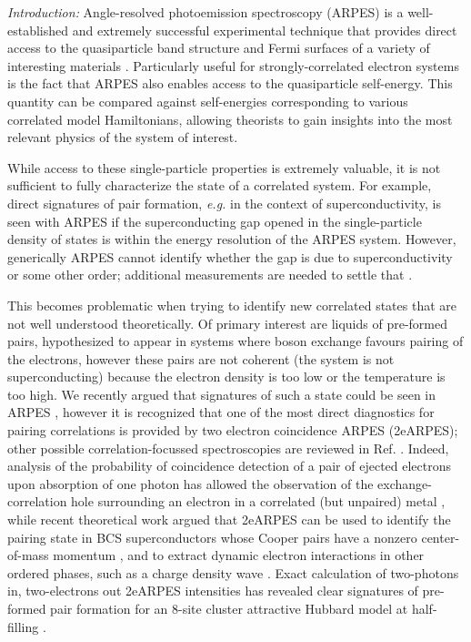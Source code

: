 \documentclass[prl,twocolumn,showpacs,amsmath,amssymb,superscriptaddress,floatfix]{revtex4}
\begin{document}
\setcounter{figure}{0}

{\em Introduction:} Angle-resolved photoemission spectroscopy (ARPES) is a well-established and  extremely successful experimental technique that provides direct access to the quasiparticle band structure and Fermi surfaces of a variety of interesting materials \cite{Damascelli2003}. Particularly useful for strongly-correlated electron systems is the fact that ARPES also enables access to  the quasiparticle self-energy. This quantity can be compared against self-energies corresponding to various correlated model Hamiltonians, allowing theorists to gain insights into the most relevant physics of the system of interest.

While access to these single-particle properties is extremely valuable, it is not sufficient to fully characterize the state of a  correlated system. For example, direct signatures of pair formation, {\em e.g.} in the context of superconductivity, is seen with ARPES  if the superconducting gap opened in the single-particle density of states is within the energy resolution of the ARPES system. However, generically ARPES cannot  identify whether the gap is due to superconductivity or some other order;  additional measurements are needed to settle that \cite{Damascelli2004}.

This becomes problematic  when trying to identify new  correlated states that are not well understood theoretically. Of primary interest are liquids of pre-formed pairs, hypothesized to appear in systems where boson exchange  favours pairing of the electrons, however these pairs are not coherent (the system is not superconducting) because the electron density is too low or the temperature is too high. We recently argued that signatures of such a state could be seen in ARPES \cite{Klemen2025}, however it  is recognized that one of the most direct diagnostics for pairing correlations is provided by two electron coincidence ARPES (2eARPES); other possible correlation-focussed spectroscopies are reviewed in Ref. \cite{Su2025}. Indeed, analysis of the probability of coincidence detection of a pair of ejected electrons upon absorption of one photon has  allowed the observation of the  exchange-correlation hole surrounding an electron in a correlated (but unpaired) metal \cite{Kirschner_2007}, while recent theoretical work  argued that 2eARPES can be used to identify the pairing state in BCS superconductors whose Cooper pairs have a nonzero center-of-mass momentum \cite{T2}, and to extract dynamic electron
interactions in other ordered phases, such as a charge density wave \cite{Kemper2025}. Exact calculation of two-photons in, two-electrons out 2eARPES intensities has revealed clear signatures of pre-formed pair formation for  an 8-site cluster attractive Hubbard model at half-filling \cite{Devereaux_2023}.
\end{document}
